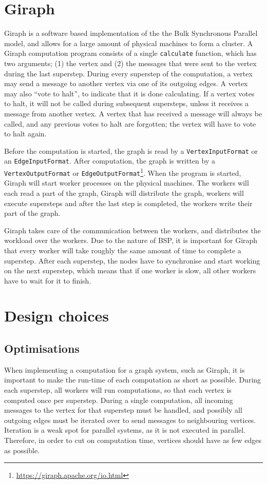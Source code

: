 \section{Giraph}
Giraph is a software based implementation of the the Bulk Synchronous Parallel model,
 and allows for a large amount of physical machines to form a cluster.
A Giraph computation program consists of a single \verb"calculate" function, which has two arguments; (1) the vertex and (2) the messages that were sent to the vertex during the last superstep.
During every superstep of the computation, a vertex may send a message to another vertex via one of its outgoing edges.
A vertex may also ``vote to halt'', to indicate that it is done calculating.
If a vertex votes to halt, it will not be called during subsequent supersteps, unless it receives a message from another vertex.
A vertex that has received a message will always be called, and any previous votes to halt are forgotten; the vertex will have to vote to halt again.

Before the computation is started, the graph is read by a \verb"VertexInputFormat" or an \verb"EdgeInputFormat".
After computation, the graph is written by a \verb"VertexOutputFormat" or \verb"EdgeOutputFormat"\footnote{\url{https://giraph.apache.org/io.html}}.
When the program is started, Giraph will start worker processes on the physical machines.
The workers will each read a part of the graph, Giraph will distribute the graph, workers will execute supersteps and after the last step is completed, the workers write their part of the graph.

Giraph takes care of the communication between the workers, and distributes the workload over the workers.
Due to the nature of BSP, it is important for Giraph that every worker will take roughly the same amount of time to complete a superstep.
After each superstep, the nodes have to synchronise and start working on the next superstep, which means that if one worker is slow, all other workers have to wait for it to finish.

\section{Design choices}
\subsection{Optimisations}
When implementing a computation for a graph system, such as Giraph, it is important to make the run-time of each computation as short as possible.
During each superstep, all workers will run computations, so that each vertex is computed once per superstep.
During a single computation, all incoming messages to the vertex for that superstep must be handled, and possibly all outgoing edges must be iterated over to send messages to neighbouring vertices.
Iteration is a weak spot for parallel systems, as it is not executed in parallel.
Therefore, in order to cut on computation time, vertices should have as few edges as possible.





